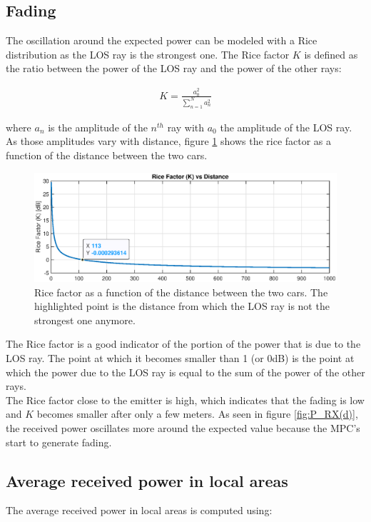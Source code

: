 \documentclass[10pt,a4paper]{ULBreport}
\begin{document}
\subsection{Fading}
\label{sec:fading}
The oscillation around the expected power can be modeled with a Rice distribution as the LOS ray is the strongest one. The Rice factor $K$ is defined as the ratio between the power of the LOS ray and the power of the other rays:

\begin{align*}
    K = \frac{a_0^2}{\sum_{n=1}^{N}a_n^2}
\end{align*}

where $a_n$ is the amplitude of the $n^{th}$ ray with $a_0$ the amplitude of the LOS ray. As those amplitudes vary with distance, figure \ref{fig:K(d)} shows the rice factor as a function of the distance between the two cars. 

\begin{figure}[H]
    \centering
    \includegraphics[width=1\textwidth]{3_4.eps}
    \caption{Rice factor as a function of the distance between the two cars. The highlighted point is the distance from which the LOS ray is not the strongest one anymore.}
    \label{fig:K(d)}
\end{figure}

The Rice factor is a good indicator of the portion of the power that is due to the LOS ray. The point at which it becomes smaller than 1 (or 0dB) is the point at which the power due to the LOS ray is equal to the sum of the power of the other rays. \\
The Rice factor close to the emitter is high, which indicates that the fading is low and $K$ becomes smaller after only a few meters. As seen in figure \ref{fig:P_RX(d)}, the received power oscillates more around the expected value because the MPC's start to generate fading.\\

\subsection{Average received power in local areas}
The average received power in local areas is computed using:
\vspace{-1cm}
\end{document}
